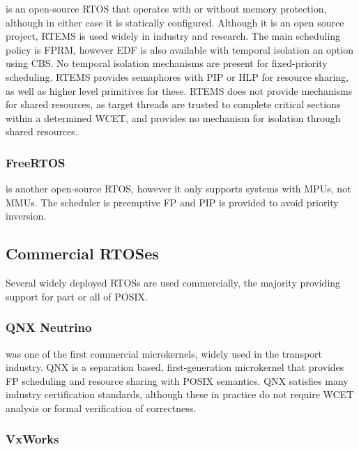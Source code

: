\citet{RTEMS:URL} is an open-source \gls{RTOS} that operates with or without memory protection,
although in either case it is statically configured.  Although it is an open source project, RTEMS
is used widely in industry and research.  The main scheduling policy is \gls{FPRM}, however
\gls{EDF} is also available with temporal isolation an option using \gls{CBS}.  No temporal
isolation mechanisms are present for fixed-priority scheduling.  RTEMS provides semaphores with
\gls{PIP} or \gls{HLP} for resource sharing, as well as higher level primitives for these. RTEMS
does not provide mechanisms for shared resources, as target threads are trusted to complete critical
sections within a determined \gls{WCET}, and provides no mechanism for isolation through shared
resources.

\subsubsection{FreeRTOS}

\citet{FreeRTOS:URL} is another open-source \gls{RTOS}, however it only supports systems with \glspl{MPU}, not
\glspl{MMU}. The scheduler is preemptive \gls{FP} and \gls{PIP} is provided to avoid priority inversion.


\subsection{Commercial RTOSes}
Several widely deployed \glspl{RTOS} are used commercially, the majority providing support for part or
all of \gls{POSIX}.  

\subsubsection{QNX Neutrino}

\citet{QNX_10} was one of the first commercial microkernels, widely used in the transport industry.
QNX is a separation based, first-generation microkernel that provides
\gls{FP} scheduling and resource sharing with POSIX semantics.  QNX satisfies many industry
certification standards, although these in practice do not require {\gls{WCET}} analysis or formal
verification of correctness. 

\subsubsection{VxWorks}

